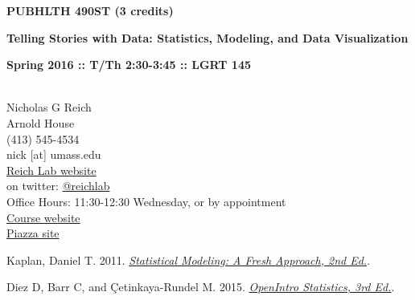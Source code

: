\documentclass[10pt]{article}
\begin{document}
\centerline{\bf \large PUBHLTH 490ST (3 credits)} 
\centerline{\bf \large Telling Stories with Data: Statistics, Modeling, and Data Visualization}
\centerline{\bf Spring 2016 :: T/Th 2:30-3:45  :: LGRT 145 }

\vspace{.25in}
\\
\noindent Nicholas G Reich \\
 Arnold House \\
\noindent (413) 545-4534 \\
\noindent nick [at] umass.edu \\
\noindent \href{http://reichlab.github.io}{Reich Lab website}\\
\noindent on twitter: \href{https://twitter.com/reichlab}{@reichlab}\\
\noindent Office Hours: 11:30-12:30 Wednesday, or by appointment \\
\noindent \href{http://nickreich.github.io/data-stories-2016/}{Course website}\\
\noindent \href{https://piazza.com/umass/spring2016/pubhlth490st/home}{Piazza site}


\bigskip
{}


Kaplan, Daniel T. 2011. \emph{\href{http://www.mosaic-web.org/go/StatisticalModeling/}{Statistical Modeling: A Fresh Approach, 2nd Ed.}}. 
  


  
  
Diez D, Barr C, and \c{C}etinkaya-Rundel M. 2015. \emph{\href{http://www.openintro.org/stat/index.php}{OpenIntro Statistics, 3rd Ed.}}.

\end{document}
